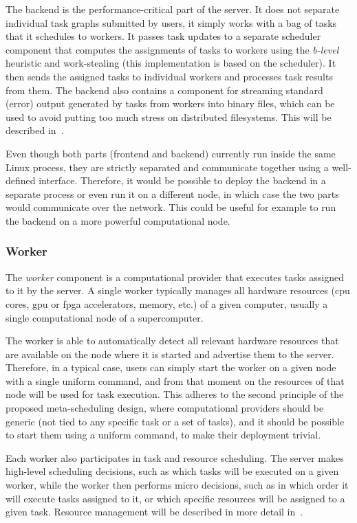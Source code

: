 The backend is the performance-critical part of the server. It does not separate individual task
graphs submitted by users, it simply works with a bag of tasks that it schedules to workers. It
passes task updates to a separate scheduler component that computes the assignments of tasks to
workers using the \emph{b-level} heuristic and work-stealing (this implementation is based
on the \rsds{} scheduler). It then sends the assigned tasks to individual workers
and processes task results from them. The backend also contains a component for streaming standard
(error) output generated by tasks from workers into binary files, which can be used to avoid
putting too much stress on distributed filesystems. This will be described
in~.

Even though both parts (frontend and backend) currently run inside the same Linux process, they are
strictly separated and communicate together using a well-defined interface. Therefore, it would be
possible to deploy the backend in a separate process or even run it on a different node, in which
case the two parts would communicate over the network. This could be useful for example to run the
backend on a more powerful computational node.

\subsubsection*{Worker}
The \emph{worker} component is a computational provider that executes tasks assigned to
it by the server. A single worker typically manages all hardware resources (\gls{cpu}
cores, \gls{gpu} or \gls{fpga} accelerators, memory, etc.) of a given
computer, usually a single computational node of a supercomputer.

The worker is able to automatically detect all relevant hardware resources that are available on
the node where it is started and advertise them to the server. Therefore, in a typical case, users
can simply start the worker on a given node with a single uniform command, and from that moment on
the resources of that node will be used for task execution. This adheres to the second principle of
the proposed meta-scheduling design, where computational providers should be generic (not tied to
any specific task or a set of tasks), and it should be possible to start them using a uniform
command, to make their deployment trivial.

Each worker also participates in task and resource scheduling. The server makes high-level
scheduling decisions, such as which tasks will be executed on a given worker, while the worker then
performs micro decisions, such as in which order it will execute tasks assigned to it, or which
specific resources will be assigned to a given task. Resource management will be described in more
detail in~.


